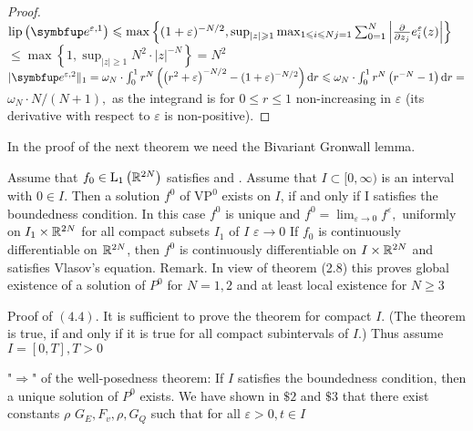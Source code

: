 \begin{lemma}
\begin{lemma}
\end{lemma}

\begin{proof}
    $\operatorname{lip}\left(\vect{e}^{\varepsilon, 1}\right) \leqslant \max \left\{(1+\varepsilon)^{-N / 2}, \sup _{|z| \geqslant 1} \max _{1 \leqslant i \leqslant N j=1} \sum_{0=1}^{N}\left|\frac{\partial}{\partial z_{j}} e_{i}^{\varepsilon}(z)\right|\right\}$
$\leqslant \max \left\{1, \sup _{|z| \geqslant 1} N^{2} \cdot|z|^{-N}\right\}=N^{2}$
$| \vect{e}^{\varepsilon, 2} \|_{1}=\omega_{N} \cdot \int_{0}^{1} r^{N}\left(\left(r^{2}+\varepsilon\right)^{-N / 2}-(1+\varepsilon)^{-N / 2}\right) \mathrm{d} r \leqslant \omega_{N} \cdot \int_{0}^{1} r^{N}\left(r^{-N}-1\right) \mathrm{d} r=$
$\omega_{N} \cdot N /(N+1),$ as the integrand is for $0 \leqslant r \leqslant 1$ non-increasing in $\varepsilon$ (its derivative with respect to $\varepsilon$ is non-positive).
\end{proof}


In the proof of the next theorem we need the Bivariant Gronwall lemma.




\begin{theorem}
    Assume that $f_{0} \in \mathrm{L}_{1}\left({\mathbb{R}}^{2 N}\right)$ satisfies \supremumf and \lipOffVsphere. Assume that $I \subset [0, \infty)$  is an interval with $ 0 \in I $. Then a solution $ f^{0}$ of $\text{VP}^{0}$ exists on $I$, if and only if I satisfies the boundedness condition. In this case $f^{0}$ is unique and $f^{0}=\lim_{\varepsilon\rightarrow 0} f^{\varepsilon},$ uniformly on $I_{1} \times {\mathbb{R}}^{2 N}$ for all compact subsets $I_{1}$ of $I$ $\varepsilon \rightarrow 0$
If $f_{0}$ is continuously differentiable on ${\mathbb{R}}^{2 N}$, then $f^{0}$ is continuously differentiable
on $I \times {\mathbb{R}}^{2 N}$ and satisfies Vlasov's equation.
Remark. In view of theorem (2.8) this proves global existence of a solution of $P^{0}$ for $N=1,2$ and at least local existence for $N \geqslant 3$
\end{theorem}

Proof of $(4.4) .$ It is sufficient to prove the theorem for compact $I$. (The theorem is true, if and only if it is true for all compact subintervals of $I$.) Thus assume $I=[0, T], T>0$

"$\Rightarrow$" of the well-posedness theorem: If $I$ satisfies the boundedness condition, then a unique solution of $P^{0}$ exists. We have shown in $\$ 2$ and $\$ 3$ that there exist constants $\rho$ $G_{E}, F_{v}, \rho, G_{Q}$ such that for all $\varepsilon>0, t \in I$



\end{lemma}

